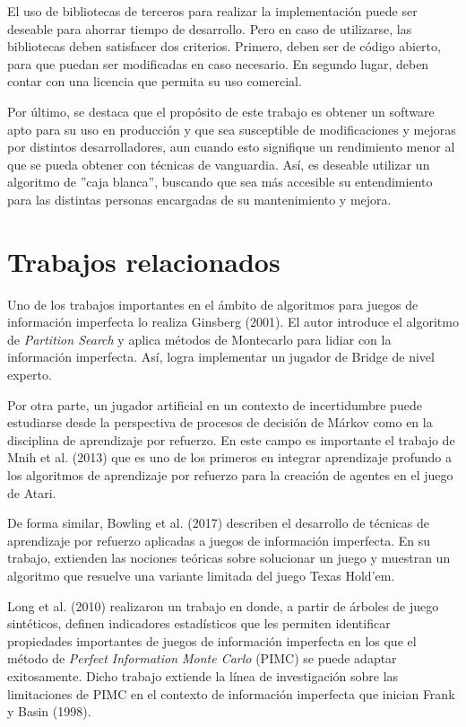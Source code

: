 El uso de bibliotecas de terceros para realizar la implementación puede ser
deseable para ahorrar tiempo de desarrollo. Pero en caso de utilizarse, las
bibliotecas deben satisfacer dos criterios. Primero, deben ser de código
abierto, para que puedan ser modificadas en caso necesario. En segundo lugar,
deben contar con una licencia que permita su uso comercial.

Por último, se destaca que el propósito de este trabajo es obtener un software
apto para su uso en producción y que sea susceptible de modificaciones y mejoras
por distintos desarrolladores, aun cuando esto signifique un rendimiento menor
al que se pueda obtener con técnicas de vanguardia. Así, es deseable utilizar un
algoritmo de ''caja blanca'', buscando que sea más accesible su entendimiento
para las distintas personas encargadas de su mantenimiento y mejora.


\section{Trabajos relacionados}

Uno de los trabajos importantes en el ámbito de algoritmos  para juegos de
información imperfecta lo realiza Ginsberg  (2001). El autor introduce el
algoritmo de \textit{Partition Search} y aplica métodos de Montecarlo para
lidiar con la información imperfecta. Así, logra implementar un jugador de Bridge
de nivel experto.

Por otra parte, un jugador artificial en un contexto de incertidumbre puede
estudiarse desde la perspectiva de procesos de decisión de Márkov como en la
disciplina de aprendizaje por refuerzo. En este campo es importante el trabajo
de Mnih et al. (2013) que es uno de los primeros en integrar aprendizaje
profundo a los algoritmos de aprendizaje por refuerzo para la creación de
agentes en el juego de Atari.

De forma similar, Bowling et al. (2017) describen el desarrollo de técnicas de
aprendizaje por refuerzo aplicadas a juegos de información imperfecta. En su
trabajo, extienden las nociones teóricas sobre solucionar un juego y muestran un
algoritmo que resuelve una variante limitada del juego Texas Hold'em.

Long et al. (2010) realizaron un trabajo en donde, a partir de árboles de juego
sintéticos, definen indicadores estadísticos que les permiten identificar
propiedades importantes de juegos de información imperfecta en los que el método
de \textit{Perfect Information Monte Carlo} (PIMC) se puede adaptar
exitosamente. Dicho trabajo extiende la línea de investigación sobre las
limitaciones de PIMC en el contexto de información imperfecta que inician Frank
y Basin (1998).

